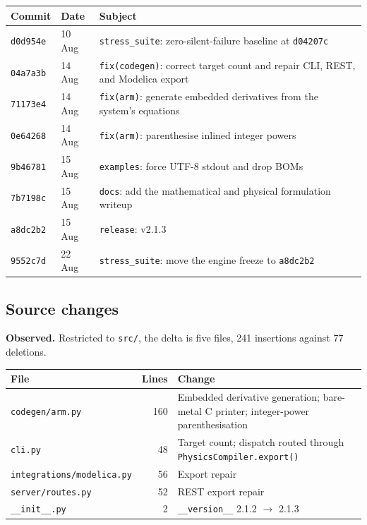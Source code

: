 \documentclass[11pt,a4paper]{article}
\newcommand{\gitsha}[1]{\texttt{#1}}
\begin{document}
\begin{center}
\begin{longtable}{@{}llL{0.46\textwidth}@{}}
\toprule
\textbf{Commit} & \textbf{Date} & \textbf{Subject} \\
\midrule
\endhead
\gitsha{d0d954e} & 10 Aug & \texttt{stress\_suite}: zero-silent-failure baseline at \gitsha{d04207c} \\
\gitsha{04a7a3b} & 14 Aug & \texttt{fix(codegen)}: correct target count and repair CLI, REST, and Modelica export \\
\gitsha{71173e4} & 14 Aug & \texttt{fix(arm)}: generate embedded derivatives from the system's equations \\
\gitsha{0e64268} & 14 Aug & \texttt{fix(arm)}: parenthesise inlined integer powers \\
\gitsha{9b46781} & 15 Aug & \texttt{examples}: force UTF-8 stdout and drop BOMs \\
\gitsha{7b7198c} & 15 Aug & \texttt{docs}: add the mathematical and physical formulation writeup \\
\gitsha{a8dc2b2} & 15 Aug & \texttt{release}: v2.1.3 \\
\midrule
\gitsha{9552c7d} & 22 Aug & \texttt{stress\_suite}: move the engine freeze to \gitsha{a8dc2b2} \\
\bottomrule
\end{longtable}
\end{center}

\subsection{Source changes}

\noindent\textbf{Observed.} Restricted to \texttt{src/}, the delta is five
files, 241 insertions against 77 deletions.

\begin{center}
\begin{tabular}{@{}lrL{0.38\textwidth}@{}}
\toprule
\textbf{File} & \textbf{Lines} & \textbf{Change} \\
\midrule
\texttt{codegen/arm.py}           & 160 & Embedded derivative generation; bare-metal C printer; integer-power parenthesisation \\
\texttt{cli.py}                   & 48  & Target count; dispatch routed through \texttt{PhysicsCompiler.export()} \\
\texttt{integrations/modelica.py} & 56  & Export repair \\
\texttt{server/routes.py}         & 52  & REST export repair \\
\texttt{\_\_init\_\_.py}          & 2   & \texttt{\_\_version\_\_} 2.1.2 $\rightarrow$ 2.1.3 \\
\bottomrule
\end{tabular}
\end{center}
\end{document}
